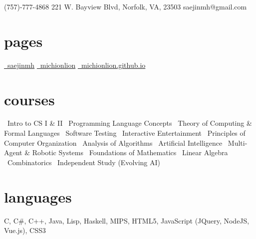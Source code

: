 \documentclass[]{friggeri-cv}
\begin{document}
       {\faMobilePhone\hspace{1mm}(757)-777-4868 \hspace{1cm} 221 W. Bayview Blvd, Norfolk, VA, 23503 \hspace{1.5cm} \faEnvelope\hspace{1.5mm}saejinmh@gmail.com}

\begin{aside}
  \section{pages}\vspace{0.05cm}
    \href{https://www.linkedin.com/in/saejinmh}{\faLinkedin\ saejinmh}\vspace{0.03cm}
    \href{https://github.com/Michionlion}{\faGithub\ michionlion}\vspace{0.03cm}
    \href{https://michionlion.github.io}{\faGlobe\ michionlion.github.io}\vspace{0.03cm}
  \section{courses}\vspace{0.05cm}
	\bullet\ Intro to CS I \& II\vspace{0.1cm}
	\bullet\ Programming Language Concepts\vspace{0.1cm}
	\bullet\ Theory of Computing \& Formal Languages\vspace{0.1cm}	
	\bullet\ Software Testing\vspace{0.1cm}
	\bullet\ Interactive Entertainment\vspace{0.1cm}
	\bullet\ Principles of Computer Organization\vspace{0.1cm}
	\bullet\ Analysis of Algorithms\vspace{0.1cm}
	\bullet\ Artificial Intelligence\vspace{0.1cm}
	\bullet\ Multi-Agent \& Robotic Systems\vspace{0.1cm}
	\bullet\ Foundations of Mathematics\vspace{0.1cm}
	\bullet\ Linear Algebra\vspace{0.1cm}
	\bullet\ Combinatorics\vspace{0.1cm}
	\bullet\ Independent Study (Evolving AI)\vspace{0.1cm}
  \section{languages}\vspace{0.05cm}
    C, C\#, C++, Java, Lisp, Haskell, MIPS, HTML5, JavaScript (JQuery, NodeJS, Vue.js), CSS3\vspace{0.1cm}

\end{aside}
\end{document}
